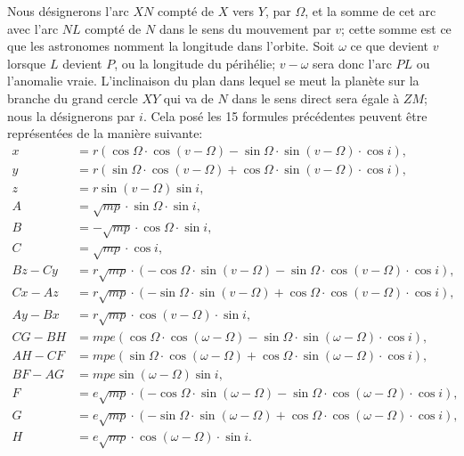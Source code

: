\documentclass[12pt,a4paper]{article}
\begin{document}
Nous d\'{e}signerons l'arc $XN$ compt\'{e} de $X$ vers $Y$, par $\Omega$, et la somme de cet arc avec l'arc $NL$ compt\'{e} de $N$ dans le sens du mouvement par $v$; cette somme est ce que les astronomes nomment la longitude dans l'orbite. Soit $\omega$ ce que devient $v$ lorsque $L$ devient $P$, ou la longitude du p\'{e}rih\'{e}lie; $v - \omega$ sera donc l'arc $PL$ ou l'anomalie vraie. L'inclinaison du plan dans lequel se meut la plan\`{e}te sur la branche du grand cercle $XY$ qui va de $N$ dans le sens direct sera \'{e}gale \`{a} $ZM$; nous la d\'{e}signerons par $i$. Cela pos\'{e} les 15 formules pr\'{e}c\'{e}dentes peuvent \^{e}tre repr\'{e}sent\'{e}es de la mani\`{e}re suivante:
\begin{align}
x &= r(\cos\Omega \cdot \cos(v - \Omega) - \sin\Omega \cdot \sin(v - \Omega) \cdot \cos i), \tag{16} \\
y &= r(\sin\Omega \cdot \cos(v - \Omega) + \cos\Omega \cdot \sin(v - \Omega) \cdot \cos i), \tag{17} \\
z &= r\sin(v - \Omega)\sin i, \tag{18} \\
A &= \sqrt{mp} \cdot \sin\Omega \cdot \sin i, \tag{19} \\
B &= -\sqrt{mp} \cdot \cos\Omega \cdot \sin i, \tag{20} \\
C &= \sqrt{mp} \cdot \cos i, \tag{21} \\
Bz - Cy &= r\sqrt{mp} \cdot (-\cos\Omega \cdot \sin(v - \Omega) - \sin\Omega \cdot \cos(v - \Omega) \cdot \cos i), \tag{22} \\
Cx - Az &= r\sqrt{mp} \cdot (-\sin\Omega \cdot \sin(v - \Omega) + \cos\Omega \cdot \cos(v - \Omega) \cdot \cos i), \tag{23} \\
Ay - Bx &= r\sqrt{mp} \cdot \cos(v - \Omega) \cdot \sin i, \tag{24} \\
CG - BH &= mpe(\cos\Omega \cdot \cos(\omega - \Omega) - \sin\Omega \cdot \sin(\omega - \Omega) \cdot \cos i), \tag{25} \\
AH - CF &= mpe(\sin\Omega \cdot \cos(\omega - \Omega) + \cos\Omega \cdot \sin(\omega - \Omega) \cdot \cos i), \tag{26} \\
BF - AG &= mpe\sin(\omega - \Omega)\sin i, \tag{27} \\
F &= e\sqrt{mp} \cdot (-\cos\Omega \cdot \sin(\omega - \Omega) - \sin\Omega \cdot \cos(\omega - \Omega) \cdot \cos i), \tag{28} \\
G &= e\sqrt{mp} \cdot (-\sin\Omega \cdot \sin(\omega - \Omega) + \cos\Omega \cdot \cos(\omega - \Omega) \cdot \cos i), \tag{29} \\
H &= e\sqrt{mp} \cdot \cos(\omega - \Omega) \cdot \sin i. \tag{30}
\end{align}
\end{document}
